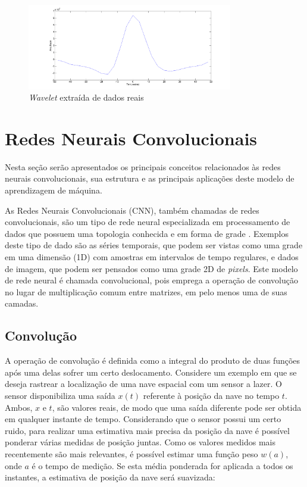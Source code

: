 \begin{figure}[htp]
\begin{center}
  \includegraphics[width=0.8\textwidth]{fig/wavelet}
  \caption{\textit{Wavelet} extraída de dados reais}
  \label{fig:wavelet}
\end{center}
\end{figure}

\section{Redes Neurais Convolucionais}
Nesta seção serão apresentados os principais conceitos relacionados às redes
neurais convolucionais, sua estrutura e as principais
aplicações deste modelo de aprendizagem de máquina.

As Redes Neurais Convolucionais (CNN), também chamadas de redes convolucionais,
são um tipo de rede neural especializada em processamento de dados que possuem uma
topologia conhecida e em forma de grade \cite{Gdfl16}. Exemplos deste tipo de dado são as séries
temporais, que podem ser vistas como uma grade em uma dimensão (1D) com amostras
em intervalos de tempo regulares, e dados de imagem, que podem ser pensados como
uma grade 2D de \textit{pixels}. Este modelo de rede neural é chamada convolucional,
pois emprega a operação de convolução no lugar de multiplicação comum entre matrizes,
em pelo menos uma de suas camadas.

\subsection{Convolução}
A operação de convolução é definida como a integral do produto de duas funções após uma delas sofrer um
certo deslocamento. Considere um exemplo em que se deseja rastrear a localização de uma
nave espacial com um sensor a lazer. O sensor disponibiliza uma saída $x(t)$ referente à posição da nave
no tempo $t$. Ambos, $x$ e $t$, são valores reais, de modo que uma saída diferente pode ser obtida
em qualquer instante de tempo. Considerando que o sensor possui um certo ruido, para realizar uma
estimativa mais precisa da posição da nave é possível ponderar várias medidas de posição juntas.
Como os valores medidos mais recentemente são mais relevantes, é possível estimar uma função peso
$w(a)$, onde $a$ é o tempo de medição. Se esta média ponderada for aplicada a todos os instantes,
a estimativa de posição da nave será suavizada:

